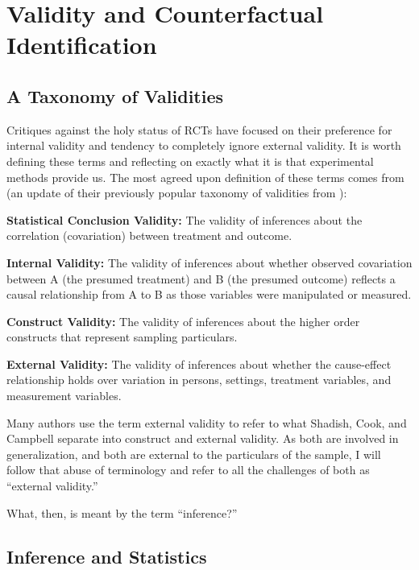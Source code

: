 \documentclass[a4paper,12pt]{article}
\begin{document}
\section{Validity and Counterfactual Identification}

\subsection{A Taxonomy of Validities}

Critiques against the holy status of RCTs have focused on their preference for internal validity and tendency to completely ignore external validity. It is worth defining these terms and reflecting on exactly what it is that experimental methods provide us. The most agreed upon definition of these terms comes from \cite{Shadish2002} (an update of their previously popular taxonomy of validities from \cite{Cook1979}):

\begin{displayquote}
\textbf{Statistical Conclusion Validity:} The validity of inferences about the correlation (covariation) between treatment and outcome.

\textbf{Internal Validity:} The validity of inferences about whether observed covariation between A (the presumed treatment) and B (the presumed outcome) reflects a causal relationship from A to B as those variables were manipulated or measured.

\textbf{Construct Validity:} The validity of inferences about the higher order constructs that represent sampling particulars.
 
\textbf{External Validity:} The validity of inferences about whether the cause-effect relationship holds over variation in persons, settings, treatment variables, and measurement variables.
\end{displayquote}

Many authors use the term external validity to refer to what Shadish, Cook, and Campbell separate into construct and external validity. As both are involved in generalization, and both are external to the particulars of the sample, I will follow that abuse of terminology and refer to all the challenges of both as ``external validity.''

What, then, is meant by the term ``inference?''

\subsection{Inference and Statistics}
\end{document}
